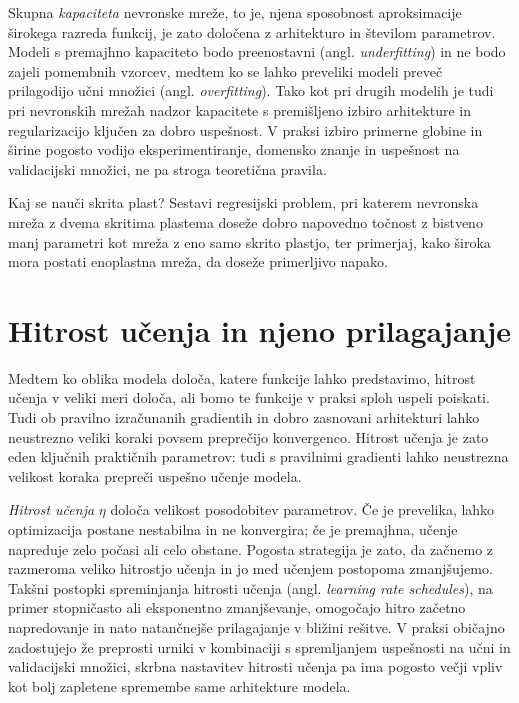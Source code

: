 Skupna \emph{kapaciteta} nevronske mreže, to je, njena sposobnost aproksimacije širokega razreda funkcij, je zato določena z arhitekturo in številom parametrov. Modeli s premajhno kapaciteto bodo preenostavni (angl. {\em underfitting}) in ne bodo zajeli pomembnih vzorcev, medtem ko se lahko preveliki modeli preveč prilagodijo učni množici (angl. {\em overfitting}). Tako kot pri drugih modelih je tudi pri nevronskih mrežah nadzor kapacitete s premišljeno izbiro arhitekture in regularizacijo ključen za dobro uspešnost. V praksi izbiro primerne globine in širine pogosto vodijo eksperimentiranje, domensko znanje in uspešnost na validacijski množici, ne pa stroga teoretična pravila.

\begin{exercise}{Kaj se nauči skrita plast?}
Sestavi regresijski problem, pri katerem nevronska mreža z dvema skritima plastema doseže dobro napovedno točnost z bistveno manj parametri kot mreža z eno samo skrito plastjo, ter primerjaj, kako široka mora postati enoplastna mreža, da doseže primerljivo napako.
\end{exercise}

\section{Hitrost učenja in njeno prilagajanje}

Medtem ko oblika modela določa, katere funkcije lahko predstavimo, hitrost učenja v veliki meri določa, ali bomo te funkcije v praksi sploh uspeli poiskati. Tudi ob pravilno izračunanih gradientih in dobro zasnovani arhitekturi lahko neustrezno veliki koraki povsem preprečijo konvergenco. Hitrost učenja je zato eden ključnih praktičnih parametrov: tudi s pravilnimi gradienti lahko neustrezna velikost koraka prepreči uspešno učenje modela.

\emph{Hitrost učenja} $\eta$ določa velikost posodobitev parametrov. Če je prevelika, lahko optimizacija postane nestabilna in ne konvergira; če je premajhna, učenje napreduje zelo počasi ali celo obstane. Pogosta strategija je zato, da začnemo z razmeroma veliko hitrostjo učenja in jo med učenjem postopoma zmanjšujemo. Takšni postopki spreminjanja hitrosti učenja (angl. {\em learning rate schedules}), na primer stopničasto ali eksponentno zmanjševanje, omogočajo hitro začetno napredovanje in nato natančnejše prilagajanje v bližini rešitve. V praksi običajno zadostujejo že preprosti urniki v kombinaciji s spremljanjem uspešnosti na učni in validacijski množici, skrbna nastavitev hitrosti učenja pa ima pogosto večji vpliv kot bolj zapletene spremembe same arhitekture modela.

